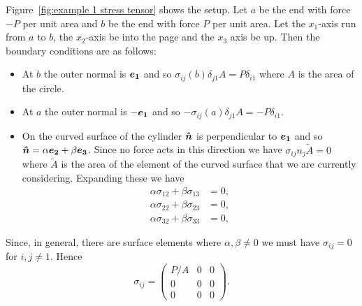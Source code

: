 \documentclass[a4paper]{article}
\begin{document}
\begin{example}
        Figure~\ref{fig:example 1 stress tensor} shows the setup.
        Let \(a\) be the end with force \(-P\) per unit area and \(b\) be the end with force \(P\) per unit area.
        Let the \(x_1\)-axis run from \(a\) to \(b\), the \(x_2\)-axis be into the page and the \(x_3\) axis be up.
        Then the boundary conditions are as follows:
        \begin{itemize}
            \item At \(b\) the outer normal is \(\bm{e_{1}}\) and so \(\sigma_{ij}(b)\delta_{j1}A = P\delta_{i1}\) where \(A\) is the area of the circle.
            \item At \(a\) the outer normal is \(-\bm{e_{1}}\) and so \(-\sigma_{ij}(a)\delta_{j1}A = -P\delta_{i1}\).
            \item On the curved surface of the cylinder \(\bm{\hat{n}}\) is perpendicular to \(\bm{e_{1}}\) and so \(\bm{\hat{n}} = \alpha \bm{e_{2}} + \beta\bm{e_{3}}\).
            Since no force acts in this direction we have \(\sigma_{ij}n_j\tilde{A} = 0\) where \(\tilde{A}\) is the area of the element of the curved surface that we are currently considering.
            Expanding these we have
            \begin{align*}
                \alpha\sigma_{12} + \beta\sigma_{13} &= 0,\\
                \alpha\sigma_{22} + \beta\sigma_{23} &= 0,\\
                \alpha\sigma_{32} + \beta\sigma_{33} &= 0,
            \end{align*}
        \end{itemize}
        Since, in general, there are surface elements where \(\alpha, \beta \ne 0\) we must have \(\sigma_{ij} = 0\) for \(i, j \ne 1\).
        Hence
        \[
            \sigma_{ij} = 
            \begin{pmatrix}
                P/A & 0 & 0\\
                0 & 0 & 0\\
                0 & 0 & 0
            \end{pmatrix}
            .
        \]
        
    \end{example}
    
\end{document}
